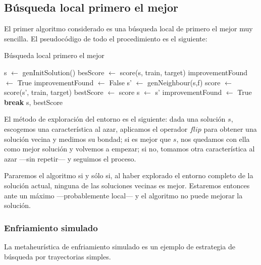 \documentclass[a4paper, 11pt, titlepage]{article}
\begin{document}
    \subsection{Búsqueda local primero el mejor}
    El primer algoritmo considerado es una búsqueda local de primero el mejor muy sencilla. El pseudocódigo de todo el procedimiento es el siguiente:

    \begin{algorithm}
        \caption{Búsqueda local primero el mejor}\label{primMejor}
        \begin{algorithmic}[1]
            \State s $\gets$ genInitSolution()
            \State besScore $\gets$ score(s, train, target)
            \State improvementFound $\gets$ True
            \State improvementFound $\gets$ False
             
            \State s' $\gets$ genNeighbour(s,f)
            \State score $\gets$ score(s', train, target)
            \State bestScore $\gets$ score
            \State s $\gets$ s'
            \State improvementFound $\gets$ True
            \State \textbf{break}
            \EndIf
            \EndFor
            \EndWhile
            \State \Return s, bestScore
            \EndFunction
        \end{algorithmic}
    \end{algorithm}

    El método de exploración del entorno es el siguiente: dada una solución $s$, escogemos una característica al azar, aplicamos el operador $flip$ para obtener una solución vecina y medimos su bondad; si es mejor que $s$, nos quedamos con ella como mejor solución y volvemos a empezar; si no, tomamos otra característica al azar ---sin repetir--- y seguimos el proceso.

    Pararemos el algoritmo si y sólo si, al haber explorado el entorno completo de la solución actual, ninguna de las soluciones vecinas es mejor. Estaremos entonces ante un máximo ---probablemente local--- y el algoritmo no puede mejorar la solución.

    \subsubsection{Enfriamiento simulado}

    La metaheurística de enfriamiento simulado es un ejemplo de estrategia de búsqueda por trayectorias simples.
\end{document}
